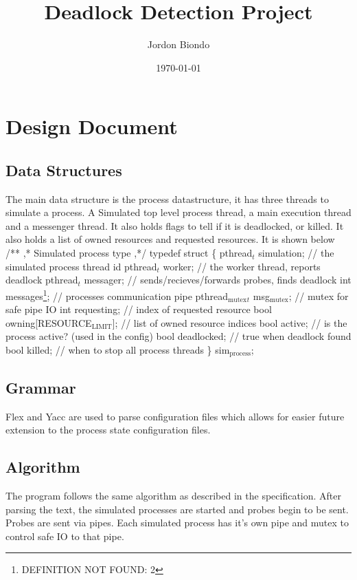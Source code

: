 \documentclass[11pt]{article}
\title{Deadlock Detection Project}
\author{Jordon Biondo}
\date{\today}
\begin{document}
\maketitle

\section{Design Document}
\label{sec-1}
\subsection{Data Structures}
\label{sec-1-1}

The main data structure is the process datastructure, it has three threads to simulate a process. A Simulated top level process thread, a main execution thread and a messenger thread. It also holds flags to tell if it is deadlocked, or killed. It also holds a list of owned resources and requested resources. It is shown below
  /**
   ,* Simulated process type
   ,*/
  typedef struct \{
    pthread$_t$ simulation;         // the simulated process thread id
    pthread$_t$ worker;             // the worker thread, reports deadlock
    pthread$_t$ messager;           // sends/recieves/forwards probes, finds deadlock
    int messages\footnote{DEFINITION NOT FOUND: 2 };              // processes communication pipe
    pthread$_{\mathrm{mutex}}$$_t$ msg$_{\mathrm{mutex}}$;    // mutex for safe pipe IO  
    int requesting;               // index of requested resource
    bool owning[RESOURCE$_{\mathrm{LIMIT}}$];  // list of owned resource indices
    bool active;                  // is the process active? (used in the config)
    bool deadlocked;              // true when deadlock found
    bool killed;                  // when to stop all process threads
  \} sim$_{\mathrm{process}}$;
  
\subsection{Grammar}
\label{sec-1-2}

Flex and Yacc are used to parse configuration files which allows for easier future extension to the process state configuration files.
\subsection{Algorithm}
\label{sec-1-3}

The program follows the same algorithm as described in the specification. After parsing the text, the simulated processes are started and probes begin to be sent. Probes are sent via pipes. Each simulated process has it's own pipe and mutex to control safe IO to that pipe.
\end{document}
